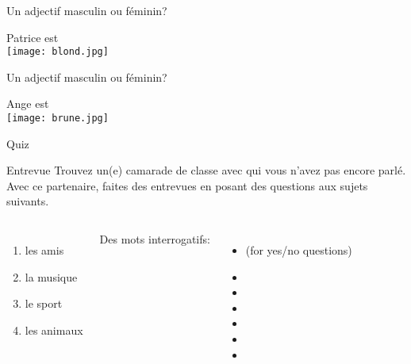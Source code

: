 \documentclass{beamer}
\begin{document}
  \begin{frame}{Un adjectif masculin ou féminin?}
    \begin{center}
      Patrice est \underline{} \\
      \texttt{[image: blond.jpg]}
    \end{center}
  \end{frame}

  \begin{frame}{Un adjectif masculin ou féminin?}
    \begin{center}
      Ange est \underline{} \\
      \texttt{[image: brune.jpg]}
    \end{center}
  \end{frame}

  \begin{frame}{}
    \begin{center}
      \Large Quiz
    \end{center}
  \end{frame}

  \begin{frame}{Entrevue}
    Trouvez un(e) camarade de classe avec qui vous n'avez pas encore parlé. Avec ce partenaire, faites des entrevues en posant des questions aux sujets suivants. \\
    \begin{columns}
        \begin{enumerate}
          \item les amis
          \item la musique
          \item le sport
          \item les animaux
        \end{enumerate}
        Des mots interrogatifs:
        \begin{itemize}
          \item {} (for yes/no questions)
          \item {} 
          \item {} 
          \item {} 
          \item {} 
          \item {} 
          \item {} 
        \end{itemize}
    \end{columns}
  \end{frame}
\end{document}
